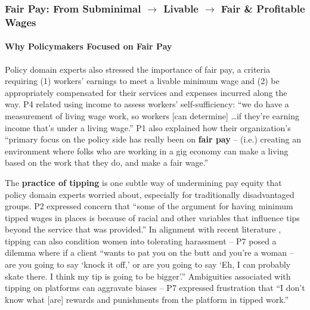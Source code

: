 {\subsubsection{Fair Pay{: From Subminimal $\rightarrow$ Livable $\rightarrow$ Fair \& Profitable Wages}} \label{pde_pay}
\paragraph{Why Policymakers Focused on Fair Pay}
{Policy domain experts} also stressed the importance of fair pay, a criteria requiring (1) workers' earnings to meet a livable minimum wage and (2) be appropriately compensated for their services and expenses incurred along the way. P4 related using income to assess workers' self-sufficiency: ``we do have a measurement of living wage work, so workers [can determine]  \dots  if they're earning income that's under a living wage.'' P1 also explained how their organization's ``primary focus on the policy side has really been on \textbf{fair pay} -- (i.e.) creating an environment where folks who are working in a gig economy can make a living based on the work that they do, and make a fair wage.'' 

The \textbf{practice of tipping} is {one} subtle way of {undermining} pay equity {that policy domain experts worried about}, especially for traditionally disadvantaged groups. P2 expressed concern that ``some of the argument for having minimum tipped wages in places is because of racial and other variables that influence tips beyond the service that was provided.'' {In alignment with recent literature \cite{ma2022brush},} tipping can also condition women into tolerating harassment {-- P7 posed a dilemma where if a client} ``wants to pat you on the butt and you're a woman – are you going to say ‘knock it off,' or are you going to say ‘Eh, I can probably skate there. I think my tip is going to be bigger'.'' Ambiguities associated with tipping on platforms can aggravate biases – P7 expressed frustration that ``I don't know what [are] rewards and punishments from the platform in tipped work.'' 

}

